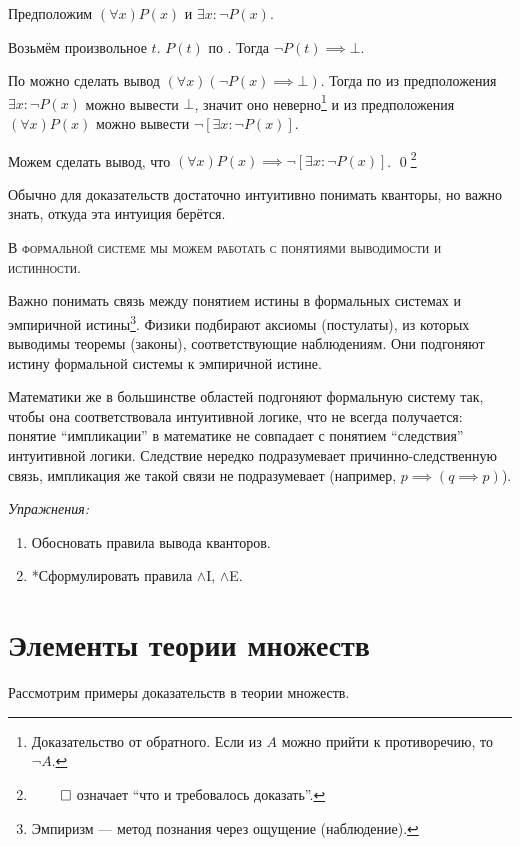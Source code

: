 Предположим $(\forall x)P(x)$ и $\exists x:\lnot P(x)$.

Возьмём произвольное $t$. $P(t)$ по \Aee. Тогда $\lnot P(t)\implies\bot$.

По \Aii{} можно сделать вывод $(\forall x)(\lnot P(x)\implies\bot)$.
Тогда по \Eee{} из предположения ${\exists x:\lnot P(x)}$ можно вывести $\bot$,
значит оно неверно\footnote{
	Доказательство от обратного. Если из $A$ можно прийти к противоречию, то $\lnot A$.
} и из предположения $(\forall x)P(x)$
можно вывести $\lnot[\exists x:\lnot P(x)]$.

Можем сделать вывод, что $(\forall x)P(x)\implies \lnot[\exists x:\lnot P(x)]$.
\qed\footnote{$\qed$ означает ``что и требовалось доказать''.}

Обычно для доказательств достаточно интуитивно понимать кванторы,
но важно знать, откуда эта интуиция берётся.

\textsc{В формальной системе мы можем работать с понятиями выводимости
	и истинности.}

Важно понимать связь между понятием истины в формальных системах
и эмпиричной истины\footnote{Эмпиризм --- метод познания через ощущение (наблюдение).}.
Физики подбирают аксиомы (постулаты),
из которых выводимы теоремы (законы), соответствующие наблюдениям.
Они подгоняют истину формальной системы к эмпиричной истине.

Математики же
в большинстве областей подгоняют формальную систему так,
чтобы она соответствовала интуитивной логике,
что не всегда получается: понятие ``импликации'' в математике не совпадает
с понятием ``следствия'' интуитивной логики. Следствие
нередко подразумевает причинно-следственную
связь, импликация же такой связи не подразумевает (например, ${p\implies(q\implies p)}$).

	{\it Упражнения:}

\begin{enumerate}
	\item{}Обосновать правила вывода кванторов.

	\item{}*Сформулировать правила $\land$I, $\land$E.
\end{enumerate}

\pagebreak

\section{Элементы теории множеств}

Рассмотрим примеры доказательств в теории множеств.

